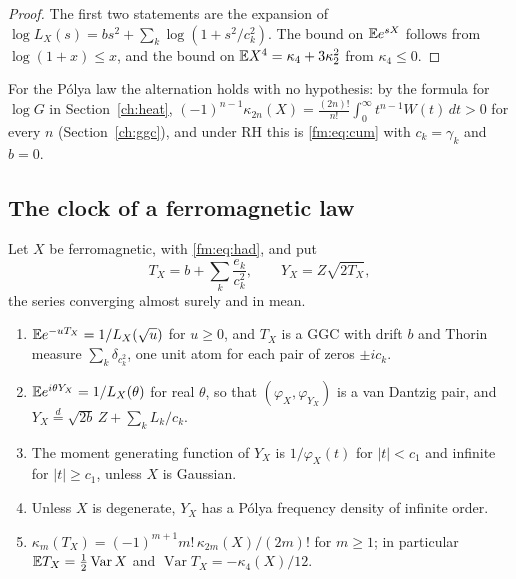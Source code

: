 \begin{proof}
The first two statements are the expansion of $\log L_X(s)=bs^2+\sum_k\log(1+s^2/c_k^2)$. The bound on $\mathbb{E} e^{sX}$ follows from $\log(1+x)\le x$, and the bound on $\mathbb{E} X^4=\kappa_4+3\kappa_2^2$ from $\kappa_4\le0$.
\end{proof}

For the P\'olya law the alternation holds with no hypothesis: by the formula for $\log G$ in Section~\ref{ch:heat}, $(-1)^{n-1}\kappa_{2n}(X)=\frac{(2n)!}{n!}\int_0^\infty t^{n-1}W(t)\,dt>0$ for every $n$ (Section~\ref{ch:ggc}), and under RH this is \eqref{fm:eq:cum} with $c_k=\gamma_k$ and $b=0$.

\subsection{The clock of a ferromagnetic law}\label{fm:sec:clock}

\begin{theorem}\label{fm:thm:dual}
Let $X$ be ferromagnetic, with \eqref{fm:eq:had}, and put
\[
T_X=b+\sum_k\frac{e_k}{c_k^2},\qquad Y_X=Z\sqrt{2T_X},
\]
the series converging almost surely and in mean.
\begin{enumerate}
\item[(i)] $\mathbb{E} e^{-uT_X}=1/L_X(\sqrt u)$ for $u\ge0$, and $T_X$ is a GGC with drift $b$ and Thorin measure $\sum_k\delta_{c_k^2}$, one unit atom for each pair of zeros $\pm ic_k$.
\item[(ii)] $\mathbb{E} e^{i\theta Y_X}=1/L_X(\theta)$ for real $\theta$, so that $(\varphi_X,\varphi_{Y_X})$ is a van Dantzig pair, and $Y_X\overset d=\sqrt{2b}\,Z+\sum_kL_k/c_k$.
\item[(iii)] The moment generating function of $Y_X$ is $1/\varphi_X(t)$ for $|t|<c_1$ and infinite for $|t|\ge c_1$, unless $X$ is Gaussian.
\item[(iv)] Unless $X$ is degenerate, $Y_X$ has a P\'olya frequency density of infinite order.
\item[(v)] $\kappa_m(T_X)=(-1)^{m+1}m!\,\kappa_{2m}(X)/(2m)!$ for $m\ge1$; in particular $\mathbb{E} T_X=\frac12\operatorname{Var}X$ and $\operatorname{Var}T_X=-\kappa_4(X)/12$.
\end{enumerate}
\end{theorem}

